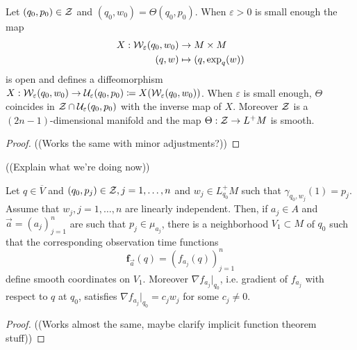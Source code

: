 \begin{lemma}
Let $(q_0,p_0)\in \mathcal{Z}$ and $(q_0,w_0)=\Theta(q_0,p_0)$. When $\varepsilon>0$ is small enough the map 
\begin{align*}
    X:\mathcal{W}_\varepsilon(q_0,w_0) &\to M\times M\\
    (q,w) &\mapsto (q,\exp_q(w))
\end{align*}
is open and defines a diffeomorphism $X:\mathcal{W}_\varepsilon(q_0,w_0)\to \mathcal{U}_\varepsilon(q_0,p_0) \coloneqq X(\mathcal{W}_\varepsilon(q_0,w_0))$. When $\varepsilon$ is small enough, $\Theta$ coincides in $\mathcal{Z}\cap \mathcal{U}_\varepsilon(q_0,p_0)$ with the inverse map of $X$. Moreover $\mathcal{Z}$ is a $(2n-1)$-dimensional manifold and the map $\Theta:\mathcal{Z}\to L^+M$ is smooth.
\end{lemma}
\begin{proof}
((Works the same with minor adjustments?))
\end{proof}

((Explain what we're doing now))

\begin{proposition}\label{prop:observationtimecoordinates}
Let $q\in \overline{V}$ and $(q_0,p_j)\in \mathcal{Z}, j=1,\dots, n$ and $w_j\in L^+_{q_0}M$ such that $\gamma_{q_0,w_j}(1) = p_j$. Assume that $w_j, j=1,\dots, n$ are linearly independent. Then, if $a_j\in A$ and $\overrightarrow{a} = (a_j)^n_{j=1}$ are such that $p_j\in \mu_{a_j}$, there is a neighborhood $V_1\subset M$ of $q_0$ such that the corresponding observation time functions 
\[
\mathbf{f}_{\overrightarrow{a}}(q) = (f_{a_j}(q))^n_{j=1}
\]
define smooth coordinates on $V_1$. Moreover $\nabla f_{a_j}\rvert_{q_0}$, i.e. gradient of $f_{a_j}$ with respect to $q$ at $q_0$, satisfies $\nabla f_{a_j}\rvert_{q_0} = c_jw_j$ for some $c_j\neq 0$.
\end{proposition}
\begin{proof}
((Works almost the same, maybe clarify implicit function theorem stuff))
\end{proof}

